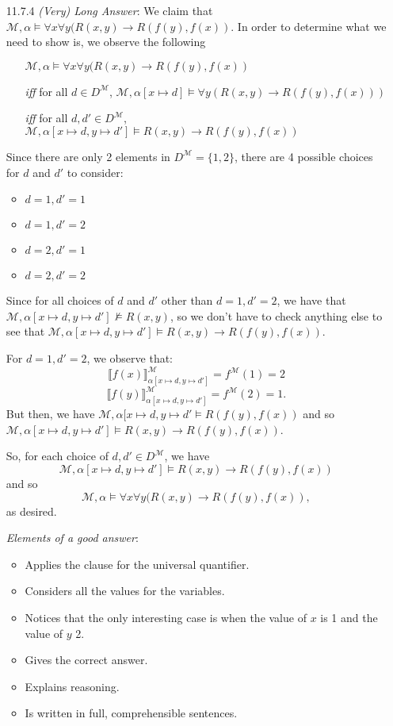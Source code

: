 \begin{itemize}
     \item[11.7.4] \emph{(Very) Long Answer}: We claim that $\mathcal{M},\alpha\vDash \forall
       x\forall y(R(x,y)\to R(f(y), f(x))$. In order to determine what
       we need to show is, we observe the following
       \begin{itemize}
       \item[] $\mathcal{M},\alpha\vDash \forall
         x\forall y(R(x,y)\to R(f(y), f(x))$
       \item[\emph{iff}] for all $d\in D^\mathcal{M}$,
         $\mathcal{M},\alpha[x\mapsto d]\vDash \forall y(R(x,y)\to
         R(f(y), f(x)))$
       \item[\emph{iff}] for all $d,d'\in D^\mathcal{M}$,
         $\mathcal{M},\alpha[x\mapsto d, y\mapsto d']\vDash R(x,y)\to
         R(f(y), f(x))$  
       \end{itemize}
      Since there are only 2 elements in $D^\mathcal{M}=\{1,2\}$,
      there are 4 possible choices for $d$ and $d'$ to consider:
      \begin{itemize}
      \item $d=1, d'=1$
      \item $d=1, d'=2$
      \item $d=2, d'=1$
      \item $d=2, d'=2$
      \end{itemize}
      Since for all choices of $d$ and $d'$ other than $d=1, d'=2$, we
      have that $\mathcal{M},\alpha[x\mapsto d, y\mapsto d']\nvDash
      R(x,y)$, so we don't have to check anything else to see that $\mathcal{M},\alpha[x\mapsto d, y\mapsto d']\vDash R(x,y)\to
      R(f(y), f(x))$. 

      For $d=1, d'=2$, we observe that:\[\llbracket
      f(x)\rrbracket^\mathcal{M}_{\alpha[x\mapsto d, y\mapsto
        d']}=f^\mathcal{M}(1)=2\]\[\llbracket
      f(y)\rrbracket^\mathcal{M}_{\alpha[x\mapsto d, y\mapsto
        d']}=f^\mathcal{M}(2)=1.\]
    But then, we have $\mathcal{M}, \alpha[x\mapsto d, y\mapsto
        d'\vDash R(f(y), f(x))$ and so  $\mathcal{M},\alpha[x\mapsto d, y\mapsto d']\vDash R(x,y)\to
      R(f(y), f(x))$.

      So, for each choice of $d,d'\in D^\mathcal{M}$, we have \[\mathcal{M},\alpha[x\mapsto d, y\mapsto d']\vDash R(x,y)\to
      R(f(y), f(x))\] and so \[\mathcal{M},\alpha\vDash \forall
      x\forall y(R(x,y)\to R(f(y), f(x)),\] as desired.

    \emph{Elements of a good answer}:

    \begin{itemize}
    \item Applies the clause for the universal quantifier.
    \item Considers all the values for the variables.
    \item Notices that the only interesting case is when the value of
      $x$ is 1 and the value of $y$ 2.
    \item Gives the correct answer.
    \item Explains reasoning.
    \item Is written in full, comprehensible sentences.
    \end{itemize}


\end{itemize}
